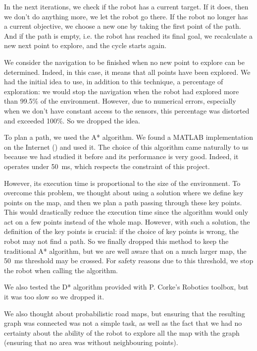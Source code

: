 \documentclass[a4paper, 10pt, conference]{ieeeconf}
\begin{document}
    In the next iterations, we check if the robot has a current target. If it does, then we don't do anything more, we let the robot go there. If the robot no longer has a current objective, we choose a new one by taking the first point of the path. And if the path is empty, i.e. the robot has reached its final goal, we recalculate a new next point to explore, and the cycle starts again.
    
    We consider the navigation to be finished when no new point to explore can be determined. Indeed, in this case, it means that all points have been explored. We had the initial idea to use, in addition to this technique, a percentage of exploration: we would stop the navigation when the robot had explored more than 99.5\% of the environment. However, due to numerical errors, especially when we don't have constant access to the sensors, this percentage was distorted and exceeded 100\%. So we dropped the idea.
    
    To plan a path, we used the A* algorithm. We found a MATLAB implementation on the Internet (\cite{astarmatlab}) and used it. The choice of this algorithm came naturally to us because we had studied it before and its performance is very good. Indeed, it operates under \SI{50}{\milli\second}, which respects the constraint of this project.
    
    However, its execution time is proportional to the size of the environment. To overcome this problem, we thought about using a solution where we define key points on the map, and then we plan a path passing through these key points. This would drastically reduce the execution time since the algorithm would only act on a few points instead of the whole map. However, with such a solution, the definition of the key points is crucial: if the choice of key points is wrong, the robot may not find a path. So we finally dropped this method to keep the traditional A* algorithm, but we are well aware that on a much larger map, the \SI{50}{\milli\second} threshold may be crossed. For safety reasons due to this threshold, we stop the robot when calling the algorithm.
    
    We also tested the D* algorithm provided with P. Corke's Robotics toolbox, but it was too slow so we dropped it.
    
    We also thought about probabilistic road maps, but ensuring that the resulting graph was connected was not a simple task, as well as the fact that we had no certainty about the ability of the robot to explore all the map with the graph (ensuring that no area was without neighbouring points).
    
\end{document}
